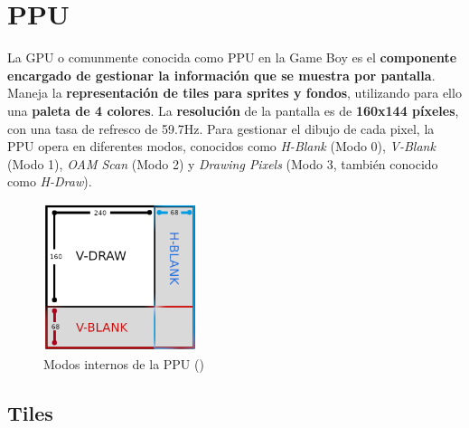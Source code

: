 \section{PPU}

La GPU o comunmente conocida como PPU en la Game Boy es el \textbf{componente encargado de gestionar la información que se muestra por pantalla}. Maneja la \textbf{representación de tiles para sprites y fondos}, utilizando para ello una \textbf{paleta de 4 colores}. La \textbf{resolución} de la pantalla es de \textbf{160x144 píxeles}, con una tasa de refresco de 59.7Hz. Para gestionar el dibujo de cada pixel, la PPU opera en diferentes modos, conocidos como \textit{H-Blank} (Modo 0), \textit{V-Blank} (Modo 1), \textit{OAM Scan} (Modo 2) y \textit{Drawing Pixels} (Modo 3, también conocido como \textit{H-Draw}).

\begin{figure}[H]
    \centering
    \includegraphics[width=0.4\textwidth]{include/images/ppu_modes.png}
    \caption{Modos internos de la PPU (\cite{goldensacra})}
    \label{figure:ppu_modes}
\end{figure}

\subsection{Tiles}

